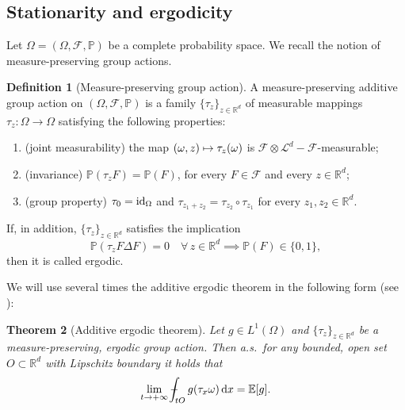 \documentclass[10pt]{amsart}
\def\mto{\mathchoice{\longmapsto}{\mapsto}{\mapsto}{\mapsto}}
\newtheorem{theorem}{Theorem}[section]
\theoremstyle{definition}
\newtheorem{definition}[theorem]{Definition}
\def\Xint#1{\mathchoice
{\XXint\displaystyle\textstyle{#1}}%
{\XXint\textstyle\scriptstyle{#1}}%
{\XXint\scriptstyle\scriptscriptstyle{#1}}%
{\XXint\scriptscriptstyle\scriptscriptstyle{#1}}%
\!\int}
\def\XXint#1#2#3{{\setbox0=\hbox{$#1{#2#3}{\int}$ }
\vcenter{\hbox{$#2#3$ }}\kern-.57\wd0}}
\def\dashint{\Xint-}
\let\w\omega
\newcommand{\dx}{\,\mathrm{d}x}
\newcommand{\R}{\mathbb{R}}
\renewcommand{\P}{\mathbb{P}}
\newcommand{\F}{\mathcal{F}}
\begin{document}
\subsection{Stationarity and ergodicity}
Let $\Omega=(\Omega,\mathcal{F},\mathbb{P})$ be a complete probability space. We recall the notion of measure-preserving group actions.
%
\begin{definition}[Measure-preserving group action]\label{def:group-action} A measure-preserving additive group action on $(\Omega,\F,\P)$ is a family $\{\tau_z\}_{z\in\R^d}$ of measurable mappings $\tau_z:\Omega\to\Omega$ satisfying the following properties:
%
\begin{enumerate}
\item\label{joint} (joint measurability) the map $(\w,z)\mto\tau_z(\w)$ is $\mathcal{F}\otimes\mathcal{L}^d-\mathcal{F}$-measurable;
\item\label{inv} (invariance) $\P(\tau_z F)=\P(F)$, for every $F\in\F$ and every $z\in\R^d$;
\item\label{group} (group property) $\tau_0=\rm id_\Omega$ and $\tau_{z_1+z_2}=\tau_{z_2}\circ\tau_{z_1}$ for every $z_1,z_2\in\R^d$.
\end{enumerate}
%
If, in addition, $\{\tau_z\}_{z\in\R^d}$ satisfies the implication
%
\begin{equation*}
\mathbb{P}(\tau_zF\Delta F)=0\quad\forall\, z\in\R^d\implies \mathbb{P}(F)\in\{0,1\},
\end{equation*}
%
then it is called ergodic.
\end{definition}
We will use several times the additive ergodic theorem in the following form (see \cite[Prop.\,2.1]{ArSm}):
\begin{theorem}[Additive ergodic theorem]\label{thm.additiv_ergodic}
Let $g\in L^1(\Omega)$ and $\{\tau_z\}_{z\in\R^d}$ be a measure-preserving, ergodic group action. Then a.s.\ for any bounded, open set $O\subset\R^d$ with Lipschitz boundary it holds that
\begin{equation*}
\lim_{t\to +\infty}\dashint_{tO}g(\tau_x\w)\dx=\mathbb{E}[g].
\end{equation*}
\end{theorem}
%
%
\end{document}
